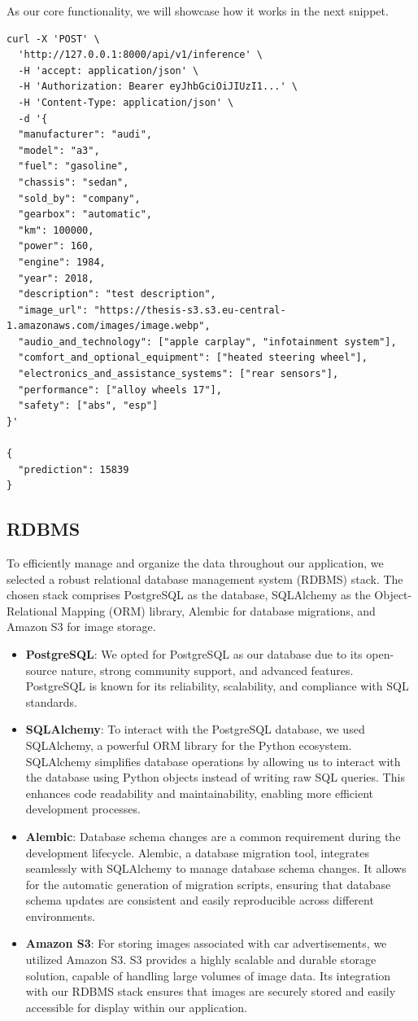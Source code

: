 As our core functionality, we will showcase how it works in the next snippet.
\begin{lstlisting}
curl -X 'POST' \
  'http://127.0.0.1:8000/api/v1/inference' \
  -H 'accept: application/json' \
  -H 'Authorization: Bearer eyJhbGciOiJIUzI1...' \
  -H 'Content-Type: application/json' \
  -d '{
  "manufacturer": "audi",
  "model": "a3",
  "fuel": "gasoline",
  "chassis": "sedan",
  "sold_by": "company",
  "gearbox": "automatic",
  "km": 100000,
  "power": 160,
  "engine": 1984,
  "year": 2018,
  "description": "test description",
  "image_url": "https://thesis-s3.s3.eu-central-1.amazonaws.com/images/image.webp",
  "audio_and_technology": ["apple carplay", "infotainment system"],
  "comfort_and_optional_equipment": ["heated steering wheel"],
  "electronics_and_assistance_systems": ["rear sensors"],
  "performance": ["alloy wheels 17"],
  "safety": ["abs", "esp"]
}'

{
  "prediction": 15839
}
\end{lstlisting}

\subsection{RDBMS}
To efficiently manage and organize the data throughout our application, we selected a robust relational database management system (RDBMS) stack. The chosen stack comprises PostgreSQL \cite{postgresql} as the database, SQLAlchemy \cite{sqlalchemy} as the Object-Relational Mapping (ORM) library, Alembic \cite{alembic} for database migrations, and Amazon S3 \cite{amazon_s3} for image storage.

\begin{itemize}
    \item \textbf{PostgreSQL}: We opted for PostgreSQL as our database due to its open-source nature, strong community support, and advanced features. PostgreSQL is known for its reliability, scalability, and compliance with SQL standards.
    \item \textbf{SQLAlchemy}: To interact with the PostgreSQL database, we used SQLAlchemy, a powerful ORM library for the Python ecosystem. SQLAlchemy simplifies database operations by allowing us to interact with the database using Python objects instead of writing raw SQL queries. This enhances code readability and maintainability, enabling more efficient development processes.
    \item \textbf{Alembic}: Database schema changes are a common requirement during the development lifecycle. Alembic, a database migration tool, integrates seamlessly with SQLAlchemy to manage database schema changes. It allows for the automatic generation of migration scripts, ensuring that database schema updates are consistent and easily reproducible across different environments.
    \item \textbf{Amazon S3}: For storing images associated with car advertisements, we utilized Amazon S3. S3 provides a highly scalable and durable storage solution, capable of handling large volumes of image data. Its integration with our RDBMS stack ensures that images are securely stored and easily accessible for display within our application.
\end{itemize}

